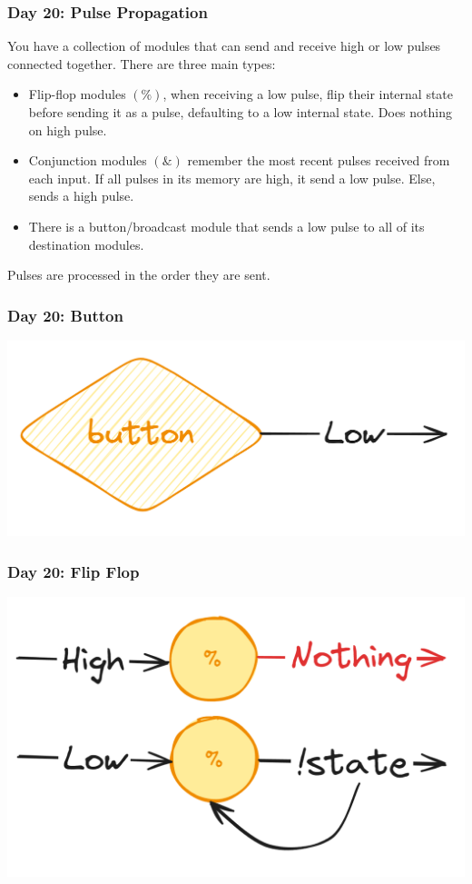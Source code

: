 \begin{frame}
\frametitle{Day 20: Pulse Propagation}

You have a collection of modules that can send and receive high or low pulses connected together. There are three main types:
\begin{itemize}
    \item Flip-flop modules $(\%)$, when receiving a low pulse, flip their internal state before sending it as a pulse, defaulting to a low internal state. Does nothing on high pulse.
    \item Conjunction modules $(\&)$ remember the most recent pulses received from each input. If all pulses in its memory are high, it send a low pulse. Else, sends a high pulse.
    \item There is a button/broadcast module that sends a low pulse to all of its destination modules.
\end{itemize}\vfill

Pulses are processed in the order they are sent.

\end{frame}

\begin{frame}
\frametitle{Day 20: Button}

\includegraphics[width=\textwidth]{Day20Button}

\end{frame}

\begin{frame}
\frametitle{Day 20: Flip Flop}

\includegraphics[width=\textwidth]{Day20FlipFlop}

\end{frame}


